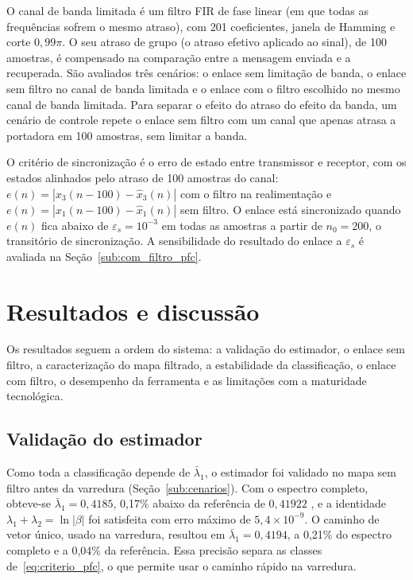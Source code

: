 \documentclass{pfccefsa}
\begin{document}
O canal de banda limitada é um filtro FIR de fase linear (em que todas as
frequências sofrem o mesmo atraso), com 201 coeficientes, janela de Hamming e
corte $0{,}99\pi$. O seu atraso de grupo (o atraso efetivo aplicado ao sinal),
de 100 amostras, é compensado na comparação entre a mensagem enviada e a recuperada. São avaliados
três cenários: o enlace sem limitação de banda, o enlace sem filtro no canal de
banda limitada e o enlace com o filtro escolhido no mesmo canal de banda
limitada. Para separar o efeito do atraso do efeito da banda, um cenário de controle
repete o enlace sem filtro com um canal que apenas atrasa a portadora em 100
amostras, sem limitar a banda.

O critério de sincronização é o erro de estado entre transmissor e receptor,
com os estados alinhados pelo atraso de 100 amostras do canal:
$e(n)=|x_3(n-100)-\hat x_3(n)|$ com o filtro na realimentação e
$e(n)=|x_1(n-100)-\hat x_1(n)|$ sem filtro. O enlace está sincronizado quando
$e(n)$ fica abaixo de $\varepsilon_s=10^{-3}$ em todas as amostras a partir de
$n_0=200$, o transitório de sincronização. A sensibilidade do resultado do enlace
a $\varepsilon_s$ é avaliada na Seção~\ref{sub:com_filtro_pfc}.


\section{Resultados e discussão}
\label{sec:resultados}

Os resultados seguem a ordem do sistema: a validação do estimador, o enlace sem
filtro, a caracterização do mapa filtrado, a estabilidade da classificação, o
enlace com filtro, o desempenho da ferramenta e as limitações com a maturidade
tecnológica.

\subsection{Validação do estimador}
\label{sub:validacao_pfc}

Como toda a classificação depende de $\bar\lambda_1$, o estimador foi validado no
mapa sem filtro antes da varredura (Seção~\ref{sub:cenarios}). Com o espectro completo, obteve-se
$\bar\lambda_1=0{,}4185$, 0,17\% abaixo da referência de $0{,}41922$
\cite{Sprott2003}, e a identidade $\lambda_1+\lambda_2=\ln|\beta|$ foi
satisfeita com erro máximo de $5{,}4\times10^{-9}$. O caminho de vetor único,
usado na varredura, resultou em $\bar\lambda_1=0{,}4194$, a 0,21\% do espectro
completo e a 0,04\% da referência. Essa precisão separa as classes
de~\eqref{eq:criterio_pfc}, o que permite usar o caminho rápido na varredura.
\end{document}
